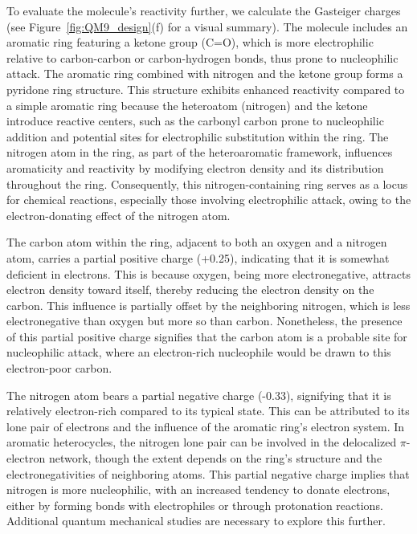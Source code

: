 To evaluate the molecule's reactivity further, we calculate the Gasteiger charges~\cite{Gasteiger1980IterativeCharges} (see Figure~\ref{fig:QM9_design}(f) for a visual summary). The molecule includes an aromatic ring featuring a ketone group (C=O), which is more electrophilic relative to carbon-carbon or carbon-hydrogen bonds, thus prone to nucleophilic attack. The aromatic ring combined with nitrogen and the ketone group forms a pyridone ring structure. This structure exhibits enhanced reactivity compared to a simple aromatic ring because the heteroatom (nitrogen) and the ketone introduce reactive centers, such as the carbonyl carbon prone to nucleophilic addition and potential sites for electrophilic substitution within the ring. The nitrogen atom in the ring, as part of the heteroaromatic framework, influences aromaticity and reactivity by modifying electron density and its distribution throughout the ring. Consequently, this nitrogen-containing ring serves as a locus for chemical reactions, especially those involving electrophilic attack, owing to the electron-donating effect of the nitrogen atom.

The carbon atom within the ring, adjacent to both an oxygen and a nitrogen atom, carries a partial positive charge (+0.25), indicating that it is somewhat deficient in electrons. This is because oxygen, being more electronegative, attracts electron density toward itself, thereby reducing the electron density on the carbon. This influence is partially offset by the neighboring nitrogen, which is less electronegative than oxygen but more so than carbon. Nonetheless, the presence of this partial positive charge signifies that the carbon atom is a probable site for nucleophilic attack, where an electron-rich nucleophile would be drawn to this electron-poor carbon.

The nitrogen atom bears a partial negative charge (-0.33), signifying that it is relatively electron-rich compared to its typical state. This can be attributed to its lone pair of electrons and the influence of the aromatic ring's electron system. In aromatic heterocycles, the nitrogen lone pair can be involved in the delocalized $\pi$-electron network, though the extent depends on the ring’s structure and the electronegativities of neighboring atoms. This partial negative charge implies that nitrogen is more nucleophilic, with an increased tendency to donate electrons, either by forming bonds with electrophiles or through protonation reactions. Additional quantum mechanical studies are necessary to explore this further.

